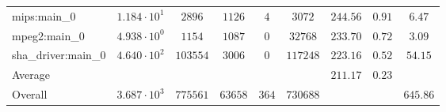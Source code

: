 \begin{tabular}{|l|c|c|c|c|c|c|c|c|}
mips:main\_0            & $ 1.184 \cdot 10^{1}  $ & $ 2896   $ & $ 1126  $ & $ 4   $ & $ 3072   $ & $ 244.56      $ & $ 0.91    $ & $ 6.47    $ \\
mpeg2:main\_0           & $ 4.938 \cdot 10^{0}  $ & $ 1154   $ & $ 1087  $ & $ 0   $ & $ 32768  $ & $ 233.70      $ & $ 0.72    $ & $ 3.09    $ \\
sha\_driver:main\_0     & $ 4.640 \cdot 10^{2}  $ & $ 103554 $ & $ 3006  $ & $ 0   $ & $ 117248 $ & $ 223.16      $ & $ 0.52    $ & $ 54.15   $ \\
\hline
Average                 & $                     $ & $        $ & $       $ & $     $ & $        $ & $ 211.17      $ & $ 0.23    $ & $         $ \\
\hline
Overall                 & $ 3.687 \cdot 10^{3}  $ & $ 775561 $ & $ 63658 $ & $ 364 $ & $ 730688 $ & $             $ & $         $ & $ 645.86  $ \\
\hline
\end{tabular}
